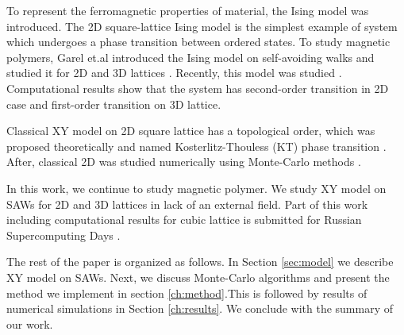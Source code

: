 To represent the ferromagnetic properties of material, the Ising model was introduced. The 2D square-lattice Ising model is the simplest example of system which undergoes a phase transition between ordered states. To study  magnetic polymers,  Garel et.al introduced the Ising model on self-avoiding walks \cite{Garel1999} and studied it for 2D and 3D lattices \cite{Garel1999, Papale2018}. Recently, this model was studied  \cite{PhysRevE.104.024122, PhysRevE.104.054501}. Computational results show that the system has second-order transition in 2D case and first-order transition on 3D lattice. 

Classical XY model on 2D square lattice has a topological order, which was proposed theoretically and named Kosterlitz-Thouless (KT) phase transition \cite{Kosterlitz_1973}. After, classical 2D was studied numerically using Monte-Carlo methods \cite{xy2005, nikolaou2007matter}. 

In this work, we continue to study magnetic polymer. We study XY model on SAWs for 2D and 3D lattices in lack of an external field. Part of this work including computational results for cubic lattice is submitted for Russian Supercomputing Days \cite{SuperCormpDays}.  
 
The rest of the paper is organized as follows. In Section \ref{sec:model} we describe XY model on SAWs. Next, we discuss Monte-Carlo algorithms and present the method we implement in section \ref{ch:method}.This is followed by results of numerical simulations in Section \ref{ch:results}. We conclude with the summary of our work.
